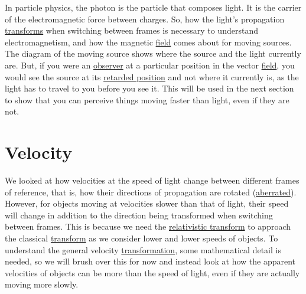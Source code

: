 In particle physics, the photon is the particle that composes light.
It is the carrier of the electromagnetic force between charges.
So, how the light's propagation \hyperlink{def-transform}{transforms} when switching between frames is necessary to understand electromagnetism, and how the magnetic \hyperlink{def-field}{field} comes about for moving sources.
The diagram of the moving source shows where the source and the light currently are.
But, if you were an \hyperlink{def-observer}{observer} at a particular position in the vector \hyperlink{def-field}{field}, you would see the source at its \hyperlink{def-retarded-position}{retarded position} and not where it currently is, as the light has to travel to you before you see it.
This will be used in the next section to show that you can perceive things moving faster than light, even if they are not.


\section{Velocity} \label{sect: (intro) Velocity}

We looked at how velocities at the speed of light change between different frames of reference, that is, how their directions of propagation are rotated (\hyperlink{def-aberration}{aberrated}).
However, for objects moving at velocities slower than that of light, their speed will change in addition to the direction being transformed when switching between frames.
This is because we need the \hyperlink{def-lorentz-transform}{relativistic transform} to approach the classical \hyperlink{def-transform}{transform} as we consider lower and lower speeds of objects.
To understand the general velocity \hyperlink{def-transform}{transformation}, some mathematical detail is needed, so we will brush over this for now and instead look at how the apparent velocities of objects can be more than the speed of light, even if they are actually moving more slowly.

